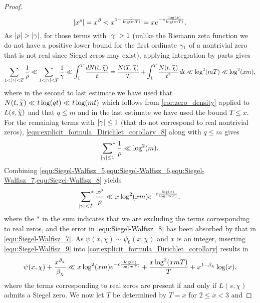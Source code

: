 \begin{proof}
      \begin{equation}\label{equ:Siegel-Walfisz_6}
        |x^{\rho}| = x^{\beta} < x^{1-\frac{c}{\log(mT)}} = xe^{-c\frac{\log(x)}{\log(mT)}}.
      \end{equation}
      As $|\rho| > |\gamma|$, for those terms with $|\gamma| > 1$ (unlike the Riemann zeta function we do not have a positive lower bound for the first ordinate $\gamma_{1}$ of a nontrivial zero that is not real since Siegel zeros may exist), applying integration by parts gives
      \begin{equation}\label{equ:Siegel-Walfisz_7}
        \sum_{1 < |\gamma| < T}\frac{1}{\rho} \ll \sum_{1 < |\gamma| < T}\frac{1}{\gamma} \ll \int_{1}^{T}\frac{dN(t,\widetilde{\chi})}{t} = \frac{N(T,\widetilde{\chi})}{T}+\int_{1}^{T}\frac{N(t,\widetilde{\chi})}{t^{2}}\,dt \ll \log^{2}(mT) \ll \log^{2}(xm),
      \end{equation}
      where in the second to last estimate we have used that $N(t,\widetilde{\chi}) \ll t\log(qt) \ll t\log(mt)$ which follows from \cref{cor:zero_density} applied to $L(s,\widetilde{\chi})$ and that $q \le m$ and in the last estimate we have used the bound $T \le x$. For the remaining terms with $|\gamma| \le 1$ (that do not correspond to real nontrivial zeros), \cref{equ:explicit_formula_Dirichlet_corollary_8} along with $q \le m$ gives
      \begin{equation}\label{equ:Siegel-Walfisz_8}
        \sideset{}{^{\ast}}\sum_{|\gamma| \le 1}\frac{1}{\rho} \ll \log^{2}(m).
      \end{equation}
      Combining \cref{equ:Siegel-Walfisz_5,equ:Siegel-Walfisz_6,equ:Siegel-Walfisz_7,equ:Siegel-Walfisz_8} yields
      \begin{equation}\label{equ:Siegel-Walfisz_9}
        \sideset{}{^{\ast}}\sum_{|\gamma| < T}\frac{x^{\rho}}{\rho} \ll x\log^{2}(xm)e^{-c\frac{\log(x)}{\log(mT)}},
      \end{equation}
      where the $\ast$ in the sum indicates that we are excluding the terms corresponding to real zeros, and the error in \cref{equ:Siegel-Walfisz_8} has been absorbed by that in \cref{equ:Siegel-Walfisz_7}. As $\psi(x,\chi) \sim \psi_{0}(x,\chi)$ and $x$ is an integer, inserting \cref{equ:Siegel-Walfisz_9} into \cref{cor:explicit_formula_Dirichlet_corollary} results in
      \begin{equation}\label{equ:Siegel-Walfisz_10}
        \psi(x,\chi)+\frac{x^{\beta_{\chi}}}{\beta_{\chi}} \ll x\log^{2}(xm)e^{-c\frac{\log(x)}{\log(mT)}}+\frac{x\log^{2}(xmT)}{T}+x^{1-\beta_{\chi}}\log(x),
      \end{equation}
      where the terms corresponding to real zeros are present if and only if $L(s,\chi)$ admits a Siegel zero. We now let $T$ be determined by $T = x$ for $2 \le x < 3$ and

\end{proof}
